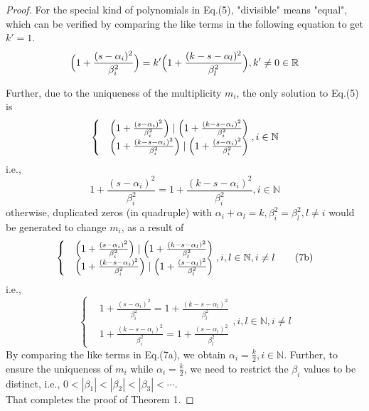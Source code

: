 \documentclass[12pt]{article}
\begin{document}
\begin{proof}
For the special kind of polynomials in Eq.(5), "divisible"  means "equal", which can be verified by comparing the like terms in the following equation to get $k'=1$.
\begin{equation}\Big{(}1+\frac{(s-\alpha_i)^2}{\beta_i^2}\Big{)}=k' \Big{(}1+\frac{(k-s-\alpha_l)^2}{\beta_l^2}\Big{)}, k'\neq 0 \in \mathbb{R}
\end{equation}

Further, due to the uniqueness of the multiplicity $m_i$, the only solution to Eq.(5) is
\begin{equation}\begin{cases}&\Big{(}1+\frac{(s-\alpha_i)^2}{\beta_i^2}\Big{)}\mid \Big{(}1+\frac{(k-s-\alpha_i)^2}{\beta_i^2}\Big{)}\\
 &\Big{(}1+\frac{(k-s-\alpha_i)^2}{\beta_i^2}\Big{)}\mid \Big{(}1+\frac{(s-\alpha_i)^2}{\beta_i^2}\Big{)}
 \end{cases}, i\in\mathbb{N}\end{equation}
i.e.,
\begin{equation}1+\frac{(s-\alpha_i)^2}{\beta_i^2}=1+\frac{(k-s-\alpha_i)^2}{\beta_i^2}, i\in\mathbb{N}\tag{7a}\end{equation}
otherwise, duplicated zeros (in quadruple) with $\alpha_i + \alpha_l = k, \beta_i^2 = \beta_l^2, l \neq i$ would be generated to change $m_i$, as a result of
\begin{equation}\begin{cases}&\Big{(}1+\frac{(s-\alpha_i)^2}{\beta_i^2}\Big{)}\mid \Big{(}1+\frac{(k-s-\alpha_l)^2}{\beta_l^2}\Big{)}\\
 &\Big{(}1+\frac{(k-s-\alpha_i)^2}{\beta_i^2}\Big{)}\mid \Big{(}1+\frac{(s-\alpha_l)^2}{\beta_l^2}\Big{)}
 \end{cases}, i, l\in\mathbb{N}, i\neq l\tag{7b}\end{equation}
 i.e.,
\begin{equation}\begin{cases}&1+\frac{(s-\alpha_i)^2}{\beta_i^2}= 1+\frac{(k-s-\alpha_l)^2}{\beta_l^2}\\
 &1+\frac{(k-s-\alpha_i)^2}{\beta_i^2}= 1+\frac{(s-\alpha_l)^2}{\beta_l^2}
 \end{cases}, i, l\in\mathbb{N}, i\neq l\tag{7c}\end{equation}
By comparing the like terms in Eq.(7a), we obtain $\alpha_i = \frac{k}{2}, i\in \mathbb{N}$.
Further, to ensure the uniqueness of $m_i$ while $\alpha_i = \frac{k}{2}$, we need to restrict the $\beta_i$ values to be distinct, i.e., $0 < |\beta_1| < |\beta_2| < |\beta_3| < \cdots$.\\
That completes the proof of Theorem 1.
\end{proof}
\end{document}
